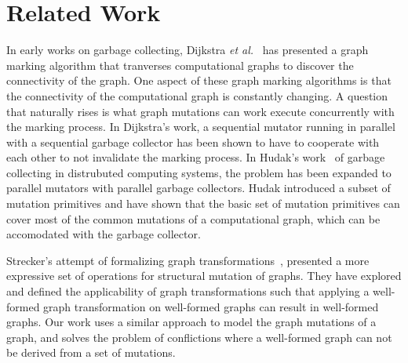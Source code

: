 \section{Related Work}
\label{sec:related}
In early works on garbage collecting, Dijkstra \textit{et
al.}~\cite{dijkstra1978} has presented a graph marking algorithm that tranverses
computational graphs to discover the connectivity of the graph. One aspect of
these graph marking algorithms is that the connectivity of the computational
graph is constantly changing. A question that naturally rises is what graph
mutations can work execute concurrently with the marking process. In Dijkstra's
work, a sequential mutator running in parallel with a sequential garbage
collector has been shown to have to cooperate with each other to not invalidate
the marking process. In Hudak's work~\cite{Hudak:1983}
of garbage collecting in distrubuted computing systems, the problem has
been expanded to parallel mutators with parallel garbage collectors. Hudak
introduced a subset of mutation primitives and have shown that the basic set of
mutation primitives can cover most of the common mutations of a computational
graph, which can be accomodated with the garbage collector.

Strecker's attempt of formalizing graph
transformations~\cite{strecker2008modeling}, presented a more expressive set of 
operations for structural mutation of graphs. They have explored and defined the
applicability of graph transformations such that applying a well-formed graph
transformation on well-formed graphs can result in well-formed graphs. Our work
uses a similar approach to model the graph mutations of a graph, and
solves the problem of conflictions where a well-formed graph can not be derived
from a set of mutations.



